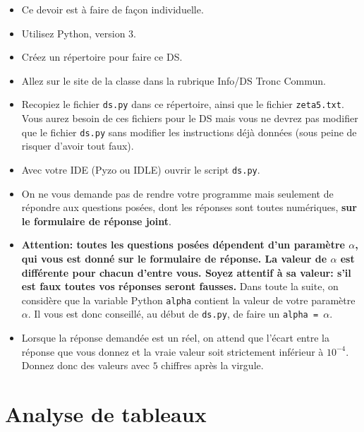 \begin{itemize}
\item Ce devoir est à faire de façon individuelle.
\item Utilisez Python, version 3.
\item Créez un répertoire pour faire ce DS.
\item Allez sur le site de la classe dans la rubrique Info/DS Tronc Commun.
\item Recopiez le fichier
  \texttt{ds.py} dans ce répertoire, ainsi
  que le fichier \texttt{zeta5.txt}.
  Vous aurez besoin de ces fichiers pour le DS mais vous ne devrez pas
 modifier que le fichier \texttt{ds.py} sans modifier les instructions déjà données (sous peine de risquer d'avoir tout faux).
\item Avec votre IDE (Pyzo ou IDLE) ouvrir le script \texttt{ds.py}. 
\item On ne vous demande pas de rendre votre programme mais seulement
  de répondre aux questions posées, dont les réponses sont toutes
  numériques, \textbf{sur le formulaire de réponse joint}.
\item \textbf{Attention: toutes les questions posées dépendent d'un
  paramètre $\alpha$, qui vous est donné sur le formulaire de réponse. La valeur de
  $\alpha$ est différente pour chacun d'entre vous. Soyez attentif à
  sa valeur: s'il est faux toutes vos réponses seront fausses.}
  Dans toute la suite, on considère que la variable Python \texttt{alpha}
  contient la valeur de votre paramètre $\alpha$. Il vous est donc
  conseillé, au début de \texttt{ds.py}, de faire un \texttt{alpha =
    $\alpha$}.
\item Lorsque la réponse demandée est un réel, on attend que l'écart
  entre la réponse que vous donnez et la vraie valeur soit strictement
  inférieur à $10^{-4}$. Donnez donc des valeurs avec $5$ chiffres après la
  virgule.
\end{itemize}


\section{Analyse de tableaux}

